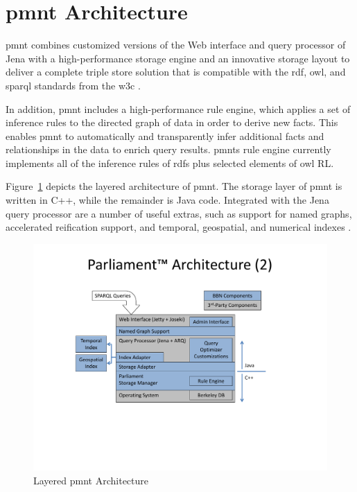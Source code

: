 \section{\ac{pmnt} Architecture}

\ac{pmnt} combines customized versions of the Web interface and query processor of Jena with a high-performance storage engine and an innovative storage layout to deliver a complete triple store solution that is compatible with the  \ac{rdf}, \ac{owl}, and \ac{sparql} standards from the \ac{w3c} \autocite{KoEmDe:09:ParliamentIndexing}.

In addition, \ac{pmnt} includes a high-performance rule engine, which applies a set of inference rules to the directed graph of data in order to derive new facts.  This enables \ac{pmnt} to automatically and transparently infer additional facts and relationships in the data to enrich query results.  \acp{pmnt} rule engine currently implements all of the inference rules of \ac{rdfs} plus selected elements of \ac{owl} RL.

Figure~\ref{figure-parliament-layers} depicts the layered architecture of \ac{pmnt}.  The storage layer of \ac{pmnt} is written in C++, while the remainder is Java code.  Integrated with the Jena query processor are a number of useful extras, such as support for named graphs, accelerated reification support, and temporal, geospatial, and numerical indexes \autocites{Ko:2010}{BaKo:2012}.

\begin{figure}[htbp]
	\centering
	\includegraphics[width=1.0\textwidth]{includes/architecture.pdf}
	\caption{Layered \ac{pmnt} Architecture}
	\label{figure-parliament-layers}
\end{figure}
